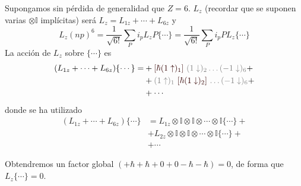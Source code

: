 Supongamos sin pérdida de generalidad que $Z=6$.
$L_z$ (recordar que se suponen varias $\otimes \mathbb{I}$ implícitas) será
$L_z=L_{1z}+\cdots+L_{6z}$ y
\begin{equation}
  L_z(np)^6 = \frac{1}{\sqrt{6!}} \sum_{P} i_p L_z P \{\cdots\} =
  \frac{1}{\sqrt{6!}} \sum_{P} i_p P L_z \{\cdots\}
\end{equation}
La acción de $L_z$ sobre $\{\cdots\}$ es
\begin{equation}
  \begin{split}
    (L_{1z}+\cdots+L_{6z}) \{\cdots\} =
    &+ \textcolor{red!20!black}{[\hbar (1\uparrow)_1]} \ \textcolor{gray}{(1\downarrow)_2 \ldots (-1\downarrow)_6 }+ \\
    &+ \textcolor{gray}{(1\uparrow)_1}\  \textcolor{red!20!black}{[\hbar(1\downarrow)_2]}\  \textcolor{gray}{\ldots (-1\downarrow)_6} + \\
    &+ \cdots
  \end{split}
\end{equation}
donde se ha utilizado
\begin{equation}
  \begin{split}
    (L_{1z } + \cdots + L_{6z}) \{\cdots \} &= L_{1z} \otimes \mathbb{I}
    \otimes \mathbb{I} \otimes \cdots \otimes \mathbb{I} \{\cdots \} + \\
    &+ L_{2z} \otimes \mathbb{I}
    \otimes \mathbb{I} \otimes \cdots \otimes \mathbb{I} \{\cdots \} +\\ 
    & + \cdots
  \end{split}
\end{equation}

Obtendremos un factor global $(+\hbar+\hbar+0+0-\hbar-\hbar)=0$, de forma
que $L_z\{\cdots\}=0$.

